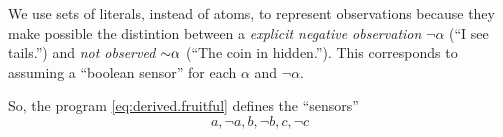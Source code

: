 \documentclass[x11names]{article}
\begin{document}
We use sets of literals, instead of atoms, to represent observations because they make possible the distintion between a \emph{explicit negative observation} $\neg\alpha$ (\eg ``I see tails.'') and \emph{not observed} $\operatorname{\sim\!} \alpha$ (\eg ``The coin in hidden.''). This corresponds to assuming a ``boolean sensor'' for each $\alpha$ and $\neg \alpha$.

So, the program \ref{eq:derived.fruitful} defines the ``sensors''
\begin{equation*}
    a, \neg a, b, \neg b, c, \neg c
\end{equation*}

\nocite{*}

\printbibliography
\end{document}

